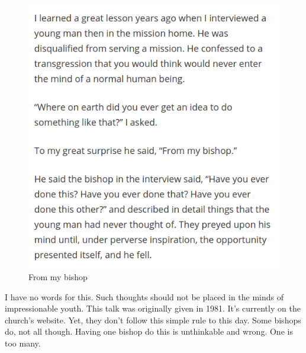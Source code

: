 \begin{figure}[h!]
  \centering
  \includegraphics[width=1\linewidth]{2018/images/bishop.png}
  \caption{From my bishop}
  \label{fig:clayton3}
\end{figure}

I have no words for this. Such thoughts should not be placed in the minds of
impressionable youth. This talk was originally given in 1981. It's currently on the
church's website. Yet, they don't follow this simple rule to this day. Some bishops
do, not all though. Having one bishop do this is unthinkable and wrong. One is too
many.